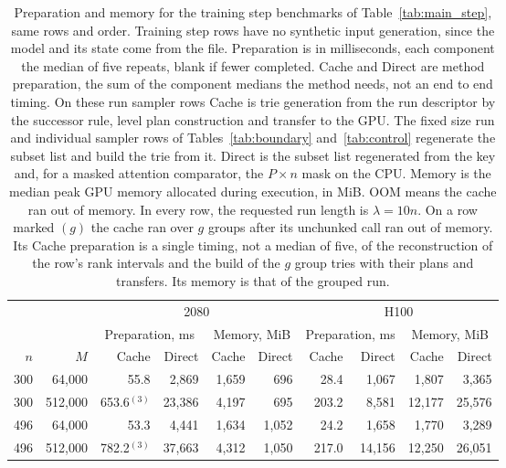 \begin{table}[!htbp]
\caption{Preparation and memory for the training step benchmarks of Table~\ref{tab:main_step}, same rows and order. Training step rows have no synthetic input generation, since the model and its state come from the file. Preparation is in milliseconds, each component the median of five repeats, blank if fewer completed. Cache and Direct are method preparation, the sum of the component medians the method needs, not an end to end timing. On these run sampler rows Cache is trie generation from the run descriptor by the successor rule, level plan construction and transfer to the GPU. The fixed size run and individual sampler rows of Tables~\ref{tab:boundary} and~\ref{tab:control} regenerate the subset list and build the trie from it. Direct is the subset list regenerated from the key and, for a masked attention comparator, the $P \times n$ mask on the CPU. Memory is the median peak GPU memory allocated during execution, in MiB. OOM means the cache ran out of memory. In every row, the requested run length is $\lambda = 10n$. On a row marked $(g)$ the cache ran over $g$ groups after its unchunked call ran out of memory. Its Cache preparation is a single timing, not a median of five, of the reconstruction of the row's rank intervals and the build of the $g$ group tries with their plans and transfers. Its memory is that of the grouped run.}
\label{tab:prep_step}
\footnotesize
\setlength{\tabcolsep}{2.5pt}
\begin{tabular}{rr rrrr rrrr}
\toprule
 &  & \multicolumn{4}{c}{2080} & \multicolumn{4}{c}{H100} \\
\cmidrule(lr){3-6} \cmidrule(lr){7-10}
 &  & \multicolumn{2}{c}{Preparation, ms} & \multicolumn{2}{c}{Memory, MiB} & \multicolumn{2}{c}{Preparation, ms} & \multicolumn{2}{c}{Memory, MiB} \\
\cmidrule(lr){3-4} \cmidrule(lr){5-6} \cmidrule(lr){7-8} \cmidrule(lr){9-10}
$n$ & $M$ & Cache & Direct & Cache & Direct & Cache & Direct & Cache & Direct \\
\midrule
300 & 64,000 & 55.8 & 2,869 & 1,659 & 696 & 28.4 & 1,067 & 1,807 & 3,365 \\
300 & 512,000 & 653.6$^{(3)}$ & 23,386 & 4,197 & 695 & 203.2 & 8,581 & 12,177 & 25,576 \\
496 & 64,000 & 53.3 & 4,441 & 1,634 & 1,052 & 24.2 & 1,658 & 1,770 & 3,289 \\
496 & 512,000 & 782.2$^{(3)}$ & 37,663 & 4,312 & 1,050 & 217.0 & 14,156 & 12,250 & 26,051 \\
\bottomrule
\end{tabular}
\end{table}